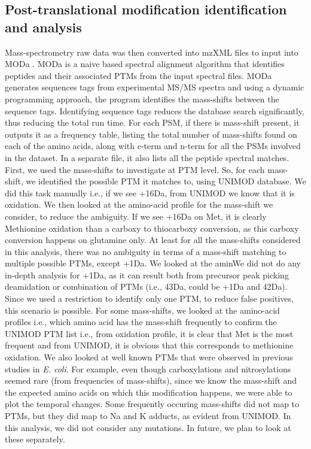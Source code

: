 \documentclass[12pt]{article}
\begin{document}
\subsection{Post-translational modification identification and analysis} 

Mass-spectrometry raw data was then converted into mzXML files to input into MODa \cite{Naetal2012}. MODa is a naive based spectral alignment algorithm that identifies peptides and their associated PTMs from the input spectral files. MODa generates sequences tags from experimental MS/MS spectra and using a dynamic programming approach, the program identifies the  mass-shifts between the sequence tags. Identifying sequence tags reduces the database search significantly, thus reducing the total run time. For each PSM, if there is mass-shift present, it outputs it as a frequency table, listing the total number of mass-shifts found on each of the amino acids, along with c-term and n-term for all the PSMs involved in the dataset. In a separate file, it also lists all the peptide spectral matches. First, we used the mass-shifts to investigate at PTM level. So, for each mass-shift, we identified the possible PTM it matches to, using UNIMOD database. We did this task manually i.e., if we see +16Da, from UNIMOD we know that it is oxidation. We then looked at the amino-acid profile for the mass-shift we consider, to reduce the ambiguity. If we see +16Da on Met, it is clearly Methionine oxidation than a carboxy to thiocarboxy conversion, as this carboxy conversion happens on glutamine only. At least for all the mass-shifts considered in this analysis, there was no ambiguity in terms of a mass-shift matching to multiple possible PTMs, except +1Da. We looked at the aminWe did not do any in-depth analysis for +1Da, as it can result both from precursor peak picking deamidation or combination of PTMs (i.e., 43Da, could be +1Da and 42Da). Since we used a restriction to identify only one PTM, to reduce false positives, this scenario is possible. For some mass-shifts, we looked at the amino-acid profiles i.e., which amino acid has the mass-shift frequently to confirm the UNIMOD PTM list i.e., from oxidation profile, it is clear that Met is the  most frequent and from UNIMOD, it is obvious that this corresponds to methionine oxidation. We also looked at well known PTMs that were observed in previous studies in \emph{E. coli}. For example, even though carboxylations and nitrosylations seemed rare (from frequencies of mass-shifts), since we know the mass-shift and the expected amino acids on which this modification happens, we were able to plot the temporal changes. Some frequently occuring mass-shifts did not map to PTMs, but they did map to Na and K adducts, as evident from UNIMOD. In this analysis, we did not consider any mutations. In future, we plan to look at these separately.
\end{document}
